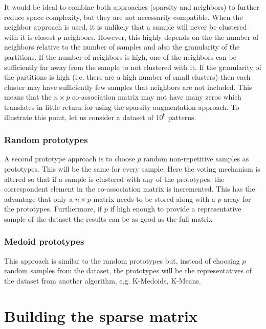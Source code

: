 It would be ideal to combine both approaches (sparsity and neighbors) to further reduce space complexity, but they are not necessarily compatible.
When the neighbor approach is used, it is unlikely that a sample will never be clustered with it is closest $p$ neighbors.
However, this highly depends on the the number of neighbors relative to the number of samples and also the granularity of the partitions.
If the number of neighbors is high, one of the neighbors can be sufficiently far away from the sample to not clustered with it.
If the granularity of the partitions is high (i.e. there are a high number of small clusters) then each cluster may have sufficiently few samples that neighbors are not included.
This means that the $n \times p$ co-association matrix may not have many zeros which translates in little return for using the sparsity augmentation approach.
To illustrate this point, let us consider a dataset of $10^6$ patterns. 


\subsubsection{Random prototypes}
A second prototype approach is to choose $p$ random non-repetitive samples as prototypes.
This will be the same for every sample.
Here the voting mechanism is altered so that if a sample is clustered with any of the prototypes, the correspondent element in the co-association matrix is incremented.
This has the advantage that only a $n \times p$ matrix needs to be stored along with a $p$ array for the prototypes.
Furthermore, if $p$ if high enough to provide a representative sample of the dataset the results can be as good as the full matrix

\subsubsection{Medoid prototypes}
This approach is similar to the random prototypes but, instead of choosing $p$ random samples from the dataset, the prototypes will be the representatives of the dataset from another algorithm, e.g. K-Medoids, K-Means.


\section{Building the sparse matrix}


